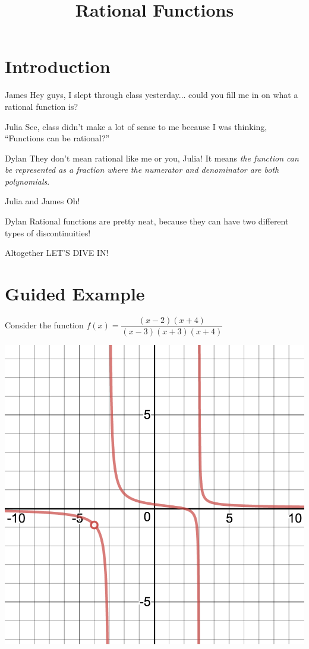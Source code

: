 \documentclass{ximera}
\title{Rational Functions}
\begin{document}
\maketitle
\section{Introduction}
\begin{dialogue}
\item[James] Hey guys, I slept through class yesterday... could you fill me in on what a rational function is?
\item[Julia] See, class didn't make a lot of sense to me because I was thinking, ``Functions can be rational?''
\item[Dylan] They don't mean rational like me or you, Julia! It means \textit{the function can be represented as a fraction where the numerator and denominator are both polynomials}.
\item[Julia and James] Oh!
\item[Dylan] Rational functions are pretty neat, because they can have two different types of discontinuities!
\item[Altogether] LET'S DIVE IN!
\end{dialogue}
\section{Guided Example}
Consider the function $f(x)=\dfrac{(x-2)(x+4)}{(x-3)(x+3)(x+4)}$
\begin{image}
\includegraphics{discontinuityGraph}
\end{image}
\end{document}
